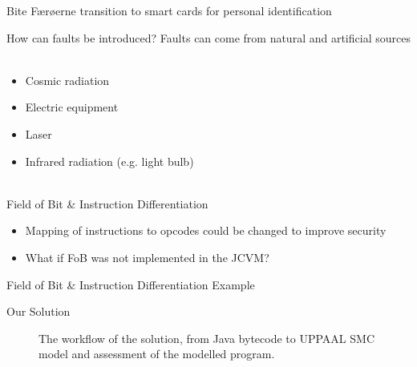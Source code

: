 


\begin{frame}[fragile]{Bite}
Færøerne transition to smart cards for personal identification
\end{frame}

\begin{frame}[fragile]{How can faults be introduced?}
Faults can come from natural and artificial sources\\~\\
	\begin{itemize}
	\item Cosmic radiation
	\item Electric equipment
	\item Laser
	\item Infrared radiation (e.g. light bulb)\\~\\
	\end{itemize}
\end{frame}

\begin{frame}[fragile]{Field of Bit \& Instruction Differentiation}
\begin{itemize}
\item Mapping of instructions to opcodes could be changed to improve security
\item What if FoB was not implemented in the JCVM?
\end{itemize}
\end{frame}

\begin{frame}[fragile]{Field of Bit \& Instruction Differentiation}
Example
\end{frame}

\begin{frame}[fragile]{Our Solution}
\begin{figure}
\centering
\def\svgwidth{1.13\columnwidth}

\caption{The workflow of the solution, from Java bytecode to UPPAAL SMC model and assessment of the modelled program.}
\label{fig:workflow_new}
\end{figure}
\end{frame}



